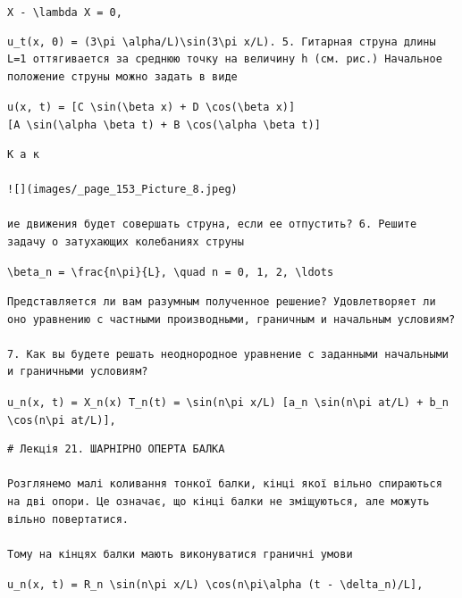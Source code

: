 \documentclass[
  ukrainian,
]{article}
\begin{document}
\texttt{X\textquotesingle{}\textquotesingle{}\ -\ \textbackslash{}lambda\ X\ =\ 0,}

\begin{verbatim}
u_t(x, 0) = (3\pi \alpha/L)\sin(3\pi x/L). 5. Гитарная струна длины L=1 оттягивается за среднюю точку на величину h (см. рис.) Начальное положение струны можно задать в виде
\end{verbatim}

\texttt{u(x,\ t)\ =\ {[}C\ \textbackslash{}sin(\textbackslash{}beta\ x)\ +\ D\ \textbackslash{}cos(\textbackslash{}beta\ x){]}{[}A\ \textbackslash{}sin(\textbackslash{}alpha\ \textbackslash{}beta\ t)\ +\ B\ \textbackslash{}cos(\textbackslash{}alpha\ \textbackslash{}beta\ t){]}}

\begin{verbatim}
К а к

![](images/_page_153_Picture_8.jpeg)

ие движения будет совершать струна, если ее отпустить? 6. Решите задачу о затухающих колебаниях струны
\end{verbatim}

\texttt{\textbackslash{}beta\_n\ =\ \textbackslash{}frac\{n\textbackslash{}pi\}\{L\},\ \textbackslash{}quad\ n\ =\ 0,\ 1,\ 2,\ \textbackslash{}ldots}

\begin{verbatim}
Представляется ли вам разумным полученное решение? Удовлетворяет ли оно уравнению с частными производными, граничным и начальным условиям?

7. Как вы будете решать неоднородное уравнение с заданными начальными и граничными условиям?
\end{verbatim}

\texttt{u\_n(x,\ t)\ =\ X\_n(x)\ T\_n(t)\ =\ \textbackslash{}sin(n\textbackslash{}pi\ x/L)\ {[}a\_n\ \textbackslash{}sin(n\textbackslash{}pi\ at/L)\ +\ b\_n\ \textbackslash{}cos(n\textbackslash{}pi\ at/L){]},}

\begin{verbatim}
# Лекція 21. ШАРНІРНО ОПЕРТА БАЛКА

Розглянемо малі коливання тонкої балки, кінці якої вільно спираються на дві опори. Це означає, що кінці балки не зміщуються, але можуть вільно повертатися.

Тому на кінцях балки мають виконуватися граничні умови
\end{verbatim}

\texttt{u\_n(x,\ t)\ =\ R\_n\ \textbackslash{}sin(n\textbackslash{}pi\ x/L)\ \textbackslash{}cos(n\textbackslash{}pi\textbackslash{}alpha\ (t\ -\ \textbackslash{}delta\_n)/L{]},}
\end{document}
